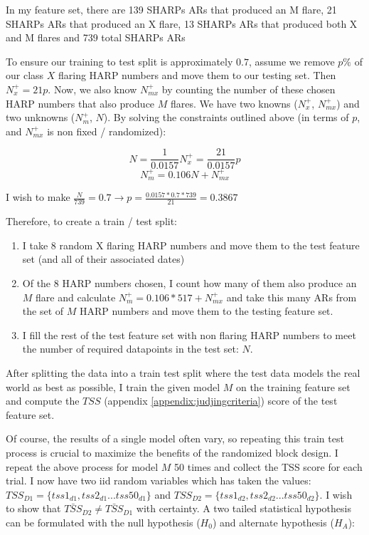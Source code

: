 In my feature set, there are 139 SHARPs ARs that produced an M flare, 21 SHARPs ARs that produced an X flare, 13 SHARPs ARs that produced both X and M flares and 739 total SHARPs ARs

To ensure our training to test split is approximately $0.7$, assume we remove $p\%$ of our class $X$ flaring HARP numbers and move them to our testing set. Then $N_{x}^+ = 21p$. Now, we also know $N_{mx}^+$ by counting the number of these chosen HARP numbers that also produce $M$ flares. We have two knowns ($N_x^+$, $N_{mx}^+$) and two unknowns ($N_m^+$, $N$). By solving the constraints outlined above (in terms of $p$, and $N_{mx}^+$ is non fixed / randomized):

$$N = \frac{1}{0.0157}N_x^+=\frac{21}{0.0157}p$$
$$N_{m}^+ = 0.106N + N_{mx}^+$$

I wish to make $\frac{N}{739} = 0.7 \rightarrow p = \frac{0.0157*0.7*739}{21} = 0.3867$

Therefore, to create a train / test split:

\begin{enumerate}
    \item I take $8$ random X flaring HARP numbers and move them to the test feature set (and all of their associated dates)
    \item Of the $8$ HARP numbers chosen, I count how many of them also produce an $M$ flare and calculate $N_{m}^+ = 0.106*517 + N_{mx}^+$ and take this many ARs from the set of $M$ HARP numbers and move them to the testing feature set.
    \item I fill the rest of the test feature set with non flaring HARP numbers to meet the number of required datapoints in the test set: $N$.
\end{enumerate}

After splitting the data into a train test split where the test data models the real world as best as possible, I train the given model $M$ on the training feature set and compute the $TSS$ (appendix \ref{appendix:judjingcriteria}) score of the test feature set. 

Of course, the results of a single model often vary, so repeating this train test process is crucial to maximize the benefits of the randomized block design. I repeat the above process for model $M$ 50 times and collect the TSS score for each trial. I now have two iid random variables which has taken the values: $TSS_{D1} = \{tss1_{d1}, tss2_{d1}... tss50_{d1}\}$ and $TSS_{D2} = \{tss1_{d2}, tss2_{d2}... tss50_{d2}\}$. I wish to show that $\bar{TSS}_{D2} \neq \bar{TSS}_{D1}$ with certainty. A two tailed statistical hypothesis can be formulated with the null hypothesis ($H_0$) and alternate hypothesis ($H_A$):

